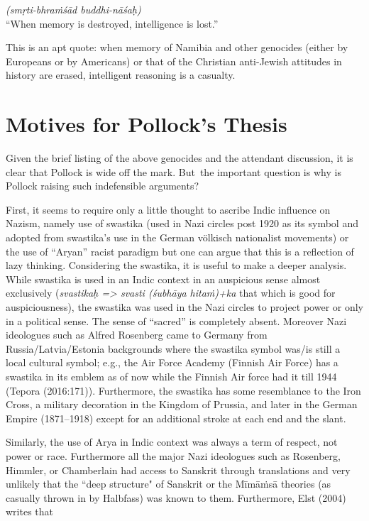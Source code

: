 \begin{myquote}
{\sl (smṛti-bhraṁśād buddhi-nāśaḥ)}\\
{\rm “When memory is destroyed, intelligence is lost.”}
\end{myquote}
This is an apt quote: when memory of Namibia and other genocides (either by Europeans or by Americans) or that of the Christian anti-Jewish attitudes in history are erased, intelligent reasoning is a casualty.

\section*{Motives for Pollock’s Thesis}
Given the brief listing of the above genocides and the attendant discussion, it is clear that Pollock is wide off the mark. But~the important question is why is Pollock raising such indefensible arguments?

First, it seems to require only a little thought to ascribe Indic influence on Nazism, namely use of swastika (used in Nazi circles post 1920 as its symbol and adopted from swastika's use in the German völkisch nationalist movements) or the use of “Aryan” racist paradigm but one can argue that this is a reflection of lazy thinking. Considering the swastika, it is useful to make a deeper analysis. While swastika is used in an Indic context in an auspicious sense almost exclusively ({\sl svastikaḥ => svasti (śubhāya hitaṁ)+ka} that which is good for auspiciousness), the swastika was used in the Nazi circles to project power or only in a political sense. The sense of “sacred” is completely absent. Moreover Nazi ideologues such as Alfred Rosenberg came to Germany from Russia/Latvia/Estonia backgrounds where the swastika symbol was/is still a local cultural symbol; e.g., the Air Force Academy (Finnish Air Force) has a swastika in its emblem as of now while the Finnish Air force had it till 1944 (Tepora (2016:171)). Furthermore, the swastika has some resemblance to the Iron Cross, a military decoration in the Kingdom of Prussia, and later in the German Empire (1871–1918) except for an additional stroke at each end and the slant.

Similarly, the use of Arya in Indic context was always a term of respect, not power or race. Furthermore all the major Nazi ideologues such as Rosenberg, Himmler, or Chamberlain had access to Sanskrit through translations and very unlikely that the ``deep structure" of Sanskrit or the Mīmāṁsā theories (as casually thrown in by Halbfass) was known to them. Furthermore, Elst (2004) writes that 

